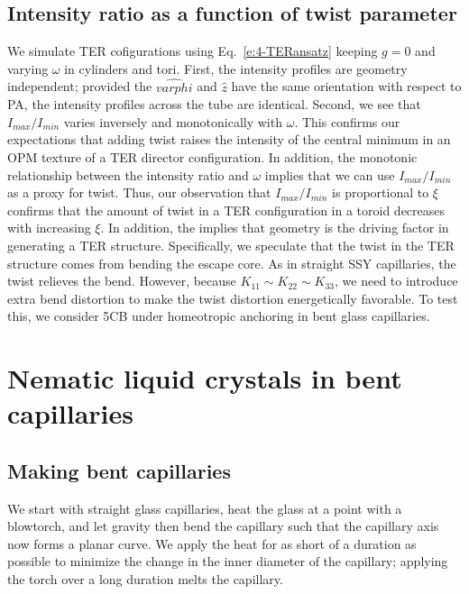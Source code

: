 \subsection{Intensity ratio as a function of twist parameter}
We simulate TER cofigurations using Eq.~\ref{e:4-TERansatz} keeping $g = 0$ and varying $\omega$ in cylinders and tori.
First, the intensity profiles are geometry independent; provided the $\hat{varphi}$ and $\hat{z}$ have the same orientation with respect to PA, the intensity profiles across the tube are identical.
Second, we see that $I_{max}/I_{min}$ varies inversely and monotonically with $\omega$.
This confirms our expectations that adding twist raises the intensity of the central minimum in an OPM texture of a TER director configuration.
In addition, the monotonic relationship between the intensity ratio and $\omega$ implies that we can use $I_{max}/I_{min}$ as a proxy for twist.
Thus, our observation that  $I_{max}/I_{min}$ is proportional to $\xi$ confirms that the amount of twist in a TER configuration in a toroid decreases with increasing $\xi$.
In addition, the implies that geometry is the driving factor in generating a TER structure.
Specifically, we speculate that the twist in the TER structure comes from bending the escape core.
As in straight SSY capillaries, the twist relieves the bend.
However, because $K_{11} \sim K_{22} \sim K_{33}$, we need to introduce extra bend distortion to make the twist distortion energetically favorable.
To test this, we consider 5CB under homeotropic anchoring in bent glass capillaries.




\section{Nematic liquid crystals in bent capillaries}
\subsection{Making bent capillaries}
We start with straight glass capillaries, heat the glass at a point with a blowtorch, and let gravity then bend the capillary such that the capillary axis now forms a planar curve.
We apply the heat for as short of a duration as possible to minimize the change in the inner diameter of the capillary; applying the torch over a long duration melts the capillary.

